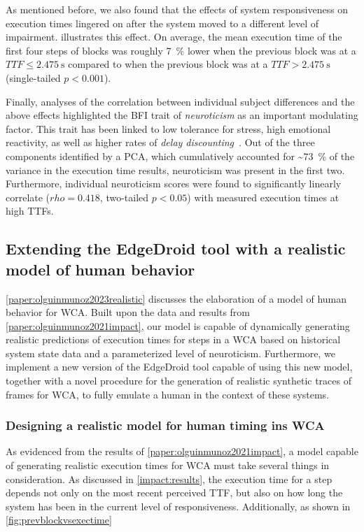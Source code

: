 As mentioned before, we also found that the effects of system responsiveness on execution times lingered on after the system moved to a different level of impairment.
 illustrates this effect.
On average, the mean execution time of the first four steps of blocks was roughly \SI{7}{\percent} lower when the previous block was at a \ensuremath{TTF \leq \SI{2.475}{\second}} compared to when the previous block was at a \ensuremath{TTF > \SI{2.475}{\second}} (single-tailed \ensuremath{p < 0.001}).

Finally, analyses of the correlation between individual subject differences and the above effects highlighted the \gls{BFI} trait of \emph{neuroticism} as an important modulating factor.
This trait has been linked to low tolerance for stress, high emotional reactivity, as well as higher rates of \emph{delay discounting}~\cite{hirsh2008delay}.
Out of the three components identified by a \gls{PCA}, which cumulatively accounted for \textasciitilde\SI{73}{\percent} of the variance in the execution time results, neuroticism was present in the first two.
Furthermore, individual neuroticism scores were found to significantly linearly correlate (\ensuremath{rho = 0.418}, two-tailed \ensuremath{p < 0.05}) with measured execution times at high \glspl{TTF}.


\subsection{Extending the EdgeDroid tool with a realistic model of human behavior}

\cref{paper:olguinmunoz2023realistic} discusses the elaboration of a model of human behavior for \gls{WCA}.
Built upon the data and results from \cref{paper:olguinmunoz2021impact}, our model is capable of dynamically generating realistic predictions of execution times for steps in a \gls{WCA} based on historical system state data and a parameterized level of neuroticism.
Furthermore, we implement a new version of the EdgeDroid tool capable of using this new model, together with a novel procedure for the generation of realistic synthetic traces of frames for \gls{WCA}, to fully emulate a human in the context of these systems.

\subsubsection{Designing a realistic model for human timing ins \gls{WCA}}

As evidenced from the results of \cref{paper:olguinmunoz2021impact}, a model capable of generating realistic execution times for \gls{WCA} must take several things in consideration.
As discussed in \cref{impact:results}, the execution time for a step depends not only on the most recent perceived \gls{TTF}, but also on how long the system has been in the current level of responsiveness.
Additionally, as shown in \cref{fig:prevblockvsexectime}
